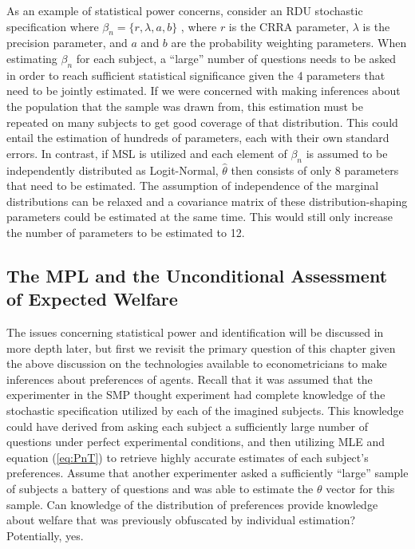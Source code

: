 \documentclass[../main.tex]{subfiles}
\begin{document}
As an example of statistical power concerns, consider an RDU stochastic specification where $\beta_n =\{r , \lambda , a , b\}$ , where $r$ is the CRRA parameter, $\lambda$ is the precision parameter, and $a$ and $b$ are the probability weighting parameters.
When estimating $\beta_n$ for each subject, a \enquote{large} number of questions needs to be asked in order to reach sufficient statistical significance given the 4 parameters that need to be jointly estimated.
If we were concerned with making inferences about the population that the sample was drawn from, this estimation must be repeated on many subjects to get good coverage of that distribution.
This could entail the estimation of hundreds of parameters, each with their own standard errors.
In contrast, if MSL is utilized and each element of $\beta_n$ is assumed to be independently distributed as Logit-Normal, $\hat{\theta}$ then consists of only 8 parameters that need to be estimated.
The assumption of independence of the marginal distributions can be relaxed and a covariance matrix of these distribution-shaping parameters could be estimated at the same time.
This would still only increase the number of parameters to be estimated to 12.

\subsection{The \texorpdfstring{\textcite{Holt2002}}{Holt and Laury (2002)} MPL and the Unconditional Assessment of Expected Welfare}

The issues concerning statistical power and identification will be discussed in more depth later, but first we revisit the primary question of this chapter given the above discussion on the technologies available to econometricians to make inferences about preferences of agents.
Recall that it was assumed that the experimenter in the SMP thought experiment had complete knowledge of the stochastic specification utilized by each of the imagined subjects.
This knowledge could have derived from asking each subject a sufficiently large number of questions under perfect experimental conditions, and then utilizing MLE and equation (\ref{eq:PnT}) to retrieve highly accurate estimates of each subject's preferences.
Assume that another experimenter asked a sufficiently \enquote{large} sample of subjects a battery of questions and was able to estimate the $\theta$ vector for this sample.
Can knowledge of the distribution of preferences provide knowledge about welfare that was previously obfuscated by individual estimation? 
Potentially, yes.
\end{document}
